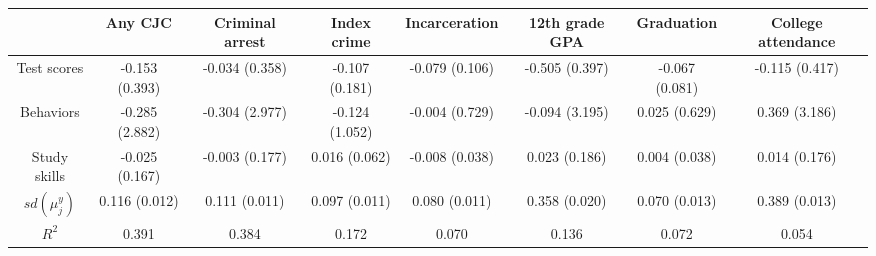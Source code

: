 \begin{tabular}{cccccccc}
\toprule
 & Any CJC & Criminal arrest & Index crime & Incarceration & 12th grade GPA & Graduation & College attendance \\
\midrule
Test scores & -0.153 (0.393) & -0.034 (0.358) & -0.107 (0.181) & -0.079 (0.106) & -0.505 (0.397) & -0.067 (0.081) & -0.115 (0.417) \\
Behaviors & -0.285 (2.882) & -0.304 (2.977) & -0.124 (1.052) & -0.004 (0.729) & -0.094 (3.195) & 0.025 (0.629) & 0.369 (3.186) \\
Study skills & -0.025 (0.167) & -0.003 (0.177) & 0.016 (0.062) & -0.008 (0.038) & 0.023 (0.186) & 0.004 (0.038) & 0.014 (0.176) \\
\hline $sd(\mu_j^y)$ & 0.116 (0.012) & 0.111 (0.011) & 0.097 (0.011) & 0.080 (0.011) & 0.358 (0.020) & 0.070 (0.013) & 0.389 (0.013) \\
$R^2$ & 0.391 & 0.384 & 0.172 & 0.070 & 0.136 & 0.072 & 0.054 \\
\bottomrule
\end{tabular}
